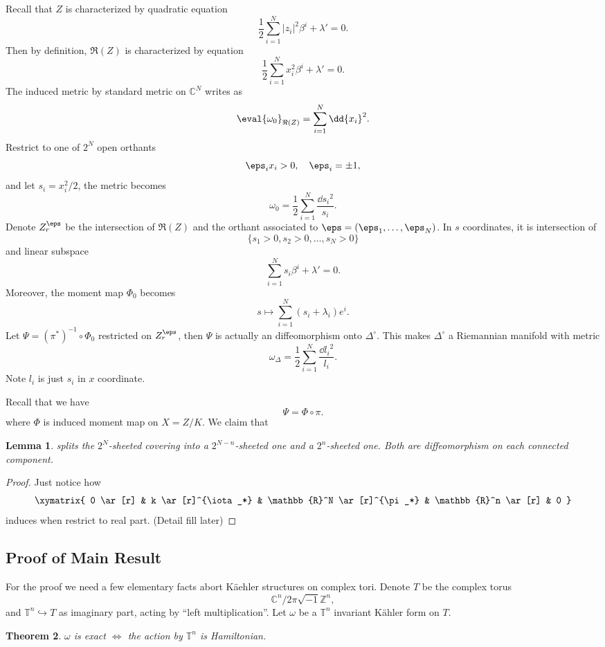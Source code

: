 \documentclass[12pt]{article}
\theoremstyle{plain}\newtheorem{theorem}{Theorem}
\theoremstyle{definition}\newtheorem{definition}[theorem]{Definition}
\theoremstyle{definition}\newtheorem{example}[theorem]{Example}
\theoremstyle{plain}\newtheorem{axiom}[theorem]{Axiom}
\theoremstyle{plain}\newtheorem{assertion}[theorem]{Assertion}
\theoremstyle{plain}\newtheorem{corollary}[theorem]{Corollary}
\theoremstyle{plain}\newtheorem{lemma}[theorem]{Lemma}
\theoremstyle{plain}\newtheorem{proposition}[theorem]{Proposition}
\theoremstyle{plain}\newtheorem{prop}[theorem]{Proposition}
\theoremstyle{plain}\newtheorem{conjecture}[theorem]{Conjecture}
\theoremstyle{plain}\newtheorem{conj}[theorem]{Conjecture}
\theoremstyle{plain}\newtheorem{problem}[theorem]{Problem}
\theoremstyle{remark}\newtheorem{notation}[theorem]{Notation}
\theoremstyle{definition}\newtheorem*{question}{Question}
\theoremstyle{definition}\newtheorem*{answer}{Answer}
\theoremstyle{definition}\newtheorem*{goal}{Goal}
\theoremstyle{plain}\newtheorem*{application}{Application}
\theoremstyle{plain}\newtheorem*{exercise}{Exercise}
\theoremstyle{remark}\newtheorem*{remark}{Remark}
\theoremstyle{remark}\newtheorem*{note}{\small{Note}}
\numberwithin{equation}{section}
\numberwithin{theorem}{section}
\numberwithin{figure}{section}
\begin{document}
Recall that \(Z\) is characterized by quadratic equation \[
    \frac{1}{2}\sum_{i=1}^{N}|z_i|^2\beta^i+\lambda'=0
.\] Then by definition,
\(\Re(Z)\) is characterized by equation \[
    \frac{1}{2}\sum_{i=1}^N x_i^2\beta^i+\lambda'=0
.\] The induced metric by standard metric on \(\mathbb{C}^N\) writes as \[
    \eval{\omega_0}_{\Re(Z)}=\sum_{i=1}^N \dd{x_i}^2
.\] Restrict to one of \(2^N\) open orthants \[
    \eps_i x_i >0,\quad \eps_i=\pm 1
,\] and let \(s_i=x_i^2/2\), the metric becomes \[
    \omega_0=\frac{1}{2}\sum_{i=1}^N \frac{\dd{s_i}^2}{s_i}
.\] Denote \(Z_r^\eps\) be the intersection of \(\Re(Z)\) and the orthant associated to
\(\eps=(\eps_1,\ldots,\eps_N)\). In \(s\) coordinates, it is intersection of \[
    \{s_1>0,s_2>0,\ldots,s_N>0\}
\] and linear subspace \[
    \sum_{i=1}^{N}s_i \beta^i+\lambda'=0
.\] Moreover, the moment map \(\Phi_0\) becomes \[
    s\longmapsto \sum_{i=1}^{N}(s_i+\lambda_i)e^i
.\] Let \(\Psi=(\pi^*)^{-1}\circ \Phi_0\) restricted on \(Z_r^\eps\), then \(\Psi\)
is actually an diffeomorphism onto \(\Delta^\circ\). This makes \(\Delta^\circ\) a
Riemannian manifold with metric 
\begin{equation}\label{eq:metric-on-polytope}
    \omega_\Delta=\frac{1}{2}\sum_{i=1}^{N}\frac{\dd{l_i}^2}{l_i}
.\end{equation}
Note \(l_i\) is just \(s_i\) in \(x\) coordinate.

Recall that we have
\begin{equation}\label{eq:phi-pi-split}
    \Psi=\Phi\circ \pi
.\end{equation}
where \(\Phi\) is induced moment map on \(X=Z/K\). We claim that
\begin{lemma}
     splits the \(2^N\)-sheeted covering into a
    \(2^{N-n}\)-sheeted one and a \(2^n\)-sheeted one. Both are diffeomorphism on
    each connected component.
\end{lemma}
\begin{proof}
    Just notice how \[
    \xymatrix{
        0 \ar[r] & k \ar[r]^{\iota_*} & \mathbb{R}^N \ar[r]^{\pi_*} & \mathbb{R}^n
        \ar[r] & 0
    }\] induces when restrict to real part. (Detail fill later)
\end{proof}

\subsection{Proof of Main Result}

For the proof we need a few elementary facts abort K\"aehler structures on complex
tori. Denote \(T\) be the complex torus \[
    \mathbb{C}^n/2\pi\sqrt{-1}\mathbb{Z}^n
,\] and \(\mathbb{T}^n\hookrightarrow T\) as imaginary part, acting by ``left
multiplication''. Let \(\omega\) be a \(\mathbb{T}^n\) invariant K\"ahler form on
\(T\).
\begin{theorem}
    \(\omega\) is exact \(\iff \) the action by \(\mathbb{T}^n\) is Hamiltonian.
\end{theorem}
\end{document}
